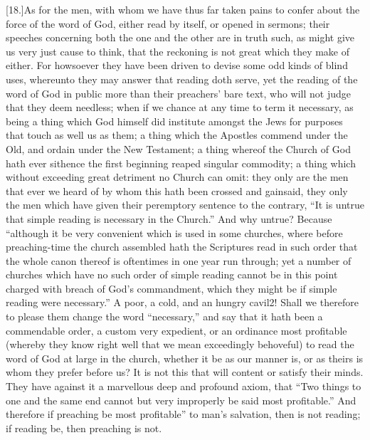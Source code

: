 [18.]As for the men, with whom we have thus far taken pains to confer about the force of the word of God, either read by itself, or opened in sermons; their speeches concerning both the one and the other are in truth such, as might give us very just cause to think, that the reckoning is not great which they make of either. For howsoever they have been driven to devise some odd kinds of blind uses, whereunto they may answer that reading doth serve, yet the reading of the word of God in public more than their preachers’ bare text, who will not judge that they deem needless; when if we chance at any time to term it necessary, as being a thing which God himself did institute amongst the Jews for purposes that touch as well us as them; a thing which the Apostles commend under the Old, and ordain under the New Testament; a thing whereof the Church of God hath ever sithence the first beginning reaped singular commodity; a thing which without exceeding great detriment no Church can omit: they only are the  men that ever we heard of by whom this hath been crossed and gainsaid,
 they only the men which have given their peremptory sentence to the contrary, “It is untrue that simple reading is necessary in the Church.” And why untrue? Because “although it be very convenient which is used in some churches, where before preaching-time the church assembled hath the Scriptures read in such order that the whole canon thereof is oftentimes in one year run through; yet a number of churches which have no such order of simple reading cannot be in this point charged with breach of God’s commandment, which they might be if simple reading were necessary.” A poor, a cold, and an hungry cavil2! Shall we therefore to please them change the word “necessary,” and say that it hath been a commendable order, a custom very expedient, or an ordinance most profitable (whereby they know right well that we mean exceedingly behoveful) to read the word of God at large in the church, whether it be as our manner is, or as theirs is whom they prefer before us? It is not this that will content or satisfy their minds. They have against it a marvellous deep and profound axiom, that “Two things to one and the same end cannot but very improperly be said most profitable.” And therefore if preaching be most profitable” to man’s salvation, then is not reading; if reading be, then preaching is not.

